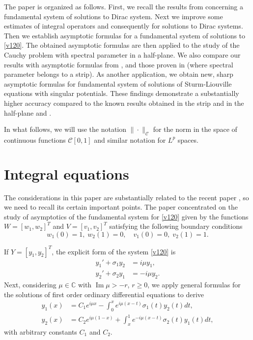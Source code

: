 \documentclass[11pt]{amsart}
\theoremstyle{plain}
\theoremstyle{definition}
\theoremstyle{remark}
\numberwithin{equation}{section}
\renewcommand\Im{\operatorname{Im}}
\begin{document}
The paper is organized as follows.
First, we recall the results from \cite{Rzep25} concerning a fundamental system of solutions to Dirac system. Next we
improve some estimates of integral operators and consequently for solutions to Dirac systems.  Then we establish  asymptotic formulas for a fundamental system of solutions
to \eqref{v120}. The obtained asymptotic formulas are then applied to the study of the Cauchy problem with spectral parameter in a half-plane.
We also compare our results with asymptotic formulas from  \cite{SaKos21}, \cite{SaKos} and those proven in \cite{Rzep21} (where spectral parameter belongs to a strip).
As another application,  we obtain new, sharp
asymptotic formulas for fundamental system of solutions
of  Sturm-Liouville equations with singular potentials.
These findings demonstrate a substantially higher accuracy compared to the known results obtained in
the strip \cite{SSsp} and in the half-plane \cite{Vladyk} and  \cite{SSad3}.

In what follows, we will use the notation $\|\cdot\|_\mathcal{C}$ for the norm in the space of continuous functions  $\mathcal C[0,1]$
and similar notation for $L^p$ spaces.

\section{Integral equations}
The considerations in this paper are substantially related to the recent paper
\cite{Rzep25}, so we need to recall its certain important points.
The paper
concentrated on the study of asymptotics  of  the fundamental system for  \eqref{v120}
given by the functions $W=[w_1,w_2]^T$ and $V=[v_1,v_2]^T$ satisfying
the following boundary conditions
\begin{equation}\label{BC}
w_1(0)=1,\;w_2(1)=0,\quad v_1(0)=0,\;v_2(1)=1.
\end{equation}

If $Y=[y_1, y_2]^T$, the explicit form of the system \eqref{v120} is
\begin{align}
y_1'+\sigma_1y_2&=i\mu y_1, \nonumber\\
y_2'+\sigma_2y_1&=-i\mu y_2. \label{sys}
\end{align}
Next, considering $\mu \in \mathbb C$ with $\Im \mu > -r$, $r \geq 0$, we apply general formulas for the
solutions of first order ordinary differential equations to derive
\begin{align}
y_1(x)&=C_1e^{i \mu x} - \int_0^x e^{i \mu (x-t)}\sigma_1(t)y_2(t)dt,\label{sys2}\\
y_2(x)&=C_2e^{i \mu(1- x)} + \int_x^1 e^{-i \mu (x-t)}\sigma_2(t)y_1(t)dt,\nonumber
\end{align}
with arbitrary constants $C_1$ and $C_2$.
\end{document}
